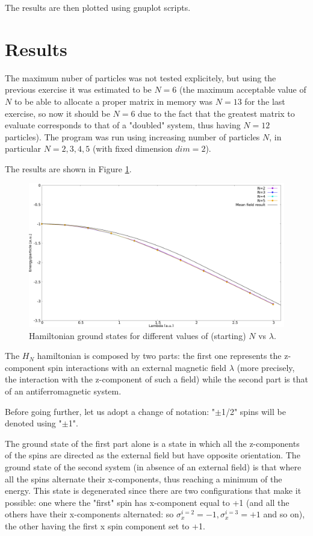 \documentclass[12pt, a4paper, notitlepage]{report}
\begin{document}
The results are then plotted using gnuplot scripts.

\section*{Results}

The maximum nuber of particles was not tested explicitely, but using the previous exercise it was estimated to be $N=6$ (the maximum acceptable value of $N$ to be able to allocate a proper matrix in memory was $N=13$ for the last exercise, so now it should be $N=6$ due to the fact that the greatest matrix to evaluate corresponds to that of a "doubled" system, thus having $N=12$ particles). The program was run using increasing number of particles $N$, in particular $N=2,3,4,5$ (with fixed dimension $dim=2$).

The results are shown in Figure \ref{figure_lambdas}.

\begin{figure}[h]
	\centering
	\includegraphics[scale=0.3]{eigval_vs_lambda.pdf}
	\caption{Hamiltonian ground states for different values of (starting) $N$ vs $\lambda$.}
	\label{figure_lambdas}
\end{figure}


The $H_N$ hamiltonian is composed by two parts: the first one represents the z-component spin interactions with an external magnetic field $\lambda$ (more precisely, the interaction with the z-component of such a field) while the second part is that of an antiferromagnetic system.

Before going further, let us adopt a change of notation: "$\pm$1/2" spins will be denoted using "$\pm$1".

The ground state of the first part alone is a state in which all the z-components of the spins are directed as the external field but have opposite orientation. The ground state of the second system (in absence of an external field) is that where all the spins alternate their x-components, thus reaching a minimum of the energy. This state is degenerated since there are two configurations that make it possible: one where the "first" spin has x-component equal to +1 (and all the others have their x-components alternated: so $\sigma_x^{i=2} = -1, \sigma_x^{i=3} = +1$ and so on), the other having the first x spin component set to +1.
\end{document}
